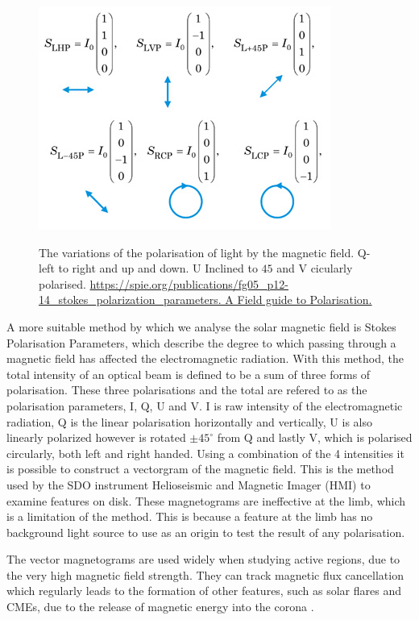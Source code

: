 \begin{figure}
	\centering
	\includegraphics[scale=3.5]{Chapter1/Figs/stokes_params}
	\label{stokes}
	\caption{The variations of the polarisation of light by the magnetic field. Q-left to right and up and down. U Inclined to $45$ and V cicularly polarised.  
		\url{https://spie.org/publications/fg05_p12-14_stokes_polarization_parameters. A Field guide to Polarisation.}}
\end{figure}

A more suitable method by which we analyse the solar magnetic field is Stokes Polarisation Parameters, which describe the degree to which passing through a magnetic field has affected the electromagnetic radiation.
With this method, the total intensity of an optical beam is defined to be a sum of three forms of polarisation.
These three polarisations and the total are refered to as the polarisation parameters, I, Q, U and V.
I is raw intensity of the electromagnetic radiation, Q is the linear polarisation horizontally and vertically, U is also linearly polarized however is rotated $\pm45^\circ$ from Q and lastly V, which is polarised circularly, both left and right handed.
Using a combination of the 4 intensities it is possible to construct a vectorgram of the magnetic field.
This is the method used by the SDO instrument Helioseismic and Magnetic Imager (HMI) to examine features on disk.
These magnetograms are ineffective at the limb, which is a limitation of the method.
This is because a feature at the limb has no background light source to use as an origin to test the result of any polarisation. 

The vector magnetograms are used widely when studying active regions, due to the very high magnetic field strength.
They can track magnetic flux cancellation which regularly leads to the formation of other features, such as solar flares and CMEs, due to the release of magnetic energy into the corona \cite{Welsch2006}.

